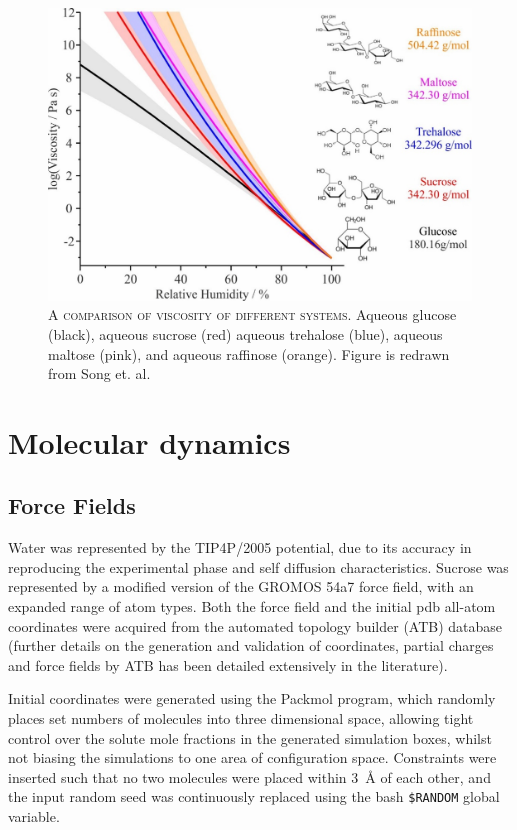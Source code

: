 \begin{figure}
    \centering
    \includegraphics{chapters/water_hopping/figures/image014.jpg}
    \caption[A comparison of viscosity of different systems]{\textsc{A comparison of viscosity of different systems}. Aqueous glucose (black), aqueous sucrose (red) aqueous trehalose (blue), aqueous maltose (pink), and aqueous raffinose (orange)\cite{Song2016a}. Figure is redrawn from Song et. al.\cite{Song2016a}}
    \label{fig:wat_s6}
\end{figure}

\section{Molecular dynamics}
\subsection{Force Fields}
Water was represented by the TIP4P/2005\cite{abascalGeneralPurposeModel2005} potential, due to its accuracy in reproducing the experimental phase and self diffusion characteristics. Sucrose was represented by a modified version of the GROMOS 54a7 force field\cite{oostenbrinkBiomolecularForceField2004}, with an expanded range of atom types. Both the force field and the initial pdb all-atom coordinates were acquired from the automated topology builder (ATB) database\cite{koziaraTestingValidationAutomated2014} (further details on the generation\cite{maldeAutomatedForceField2011} and validation\cite{schmidDefinitionTestingGROMOS2011} of coordinates, partial charges and force fields by ATB has been detailed extensively in the literature).

Initial coordinates were generated using the Packmol\cite{martinez2009packmol} program, which randomly places set numbers of molecules into three dimensional space, allowing tight control over the solute mole fractions in the generated simulation boxes, whilst not biasing the simulations to one area of configuration space. Constraints were inserted such that no two molecules were placed within \SI{3}{\angstrom} of each other, and the input random seed was continuously replaced using the bash \texttt{\$RANDOM} global variable. 

